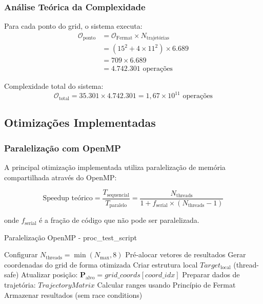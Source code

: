 \documentclass[12pt,a4paper]{article}
\begin{document}
\subsubsection{Análise Teórica da Complexidade}

Para cada ponto do grid, o sistema executa:
\begin{align}
\mathcal{O}_{\text{ponto}} &= \mathcal{O}_{\text{Fermat}} \times N_{\text{trajetórias}} \\
&= (15^2 + 4 \times 11^2) \times 6.689 \\
&= 709 \times 6.689 \\
&= 4.742.301 \text{ operações}
\end{align}

Complexidade total do sistema:
\begin{equation}
\mathcal{O}_{\text{total}} = 35.301 \times 4.742.301 = 1,67 \times 10^{11} \text{ operações}
\end{equation}

\subsection{Otimizações Implementadas}

\subsubsection{Paralelização com OpenMP}

A principal otimização implementada utiliza paralelização de memória compartilhada através do OpenMP:

\begin{equation}
\text{Speedup teórico} = \frac{T_{\text{sequencial}}}{T_{\text{paralelo}}} = \frac{N_{\text{threads}}}{1 + f_{\text{serial}} \times (N_{\text{threads}} - 1)}
\end{equation}

onde $f_{\text{serial}}$ é a fração de código que não pode ser paralelizada.

\begin{algorithm}[H]
\caption{Paralelização OpenMP - proc\_test\_script}
\begin{algorithmic}[1]
\STATE Configurar $N_{\text{threads}} = \min(N_{\text{max}}, 8)$
\STATE Pré-alocar vetores de resultados
\STATE Gerar coordenadas do grid de forma otimizada
\FORALL{$coord\_idx \in [0, 35.301)$ \textbf{em paralelo}}
    \STATE Criar estrutura local $Target_{\text{local}}$ (thread-safe)
    \STATE Atualizar posição: $\mathbf{P}_{\text{alvo}} = grid\_coords[coord\_idx]$
    \STATE Preparar dados de trajetória: $TrajectoryMatrix$
    \STATE Calcular ranges usando Princípio de Fermat
    \STATE Armazenar resultados (sem race conditions)
\ENDFOR
\end{algorithmic}
\end{algorithm}
\end{document}
